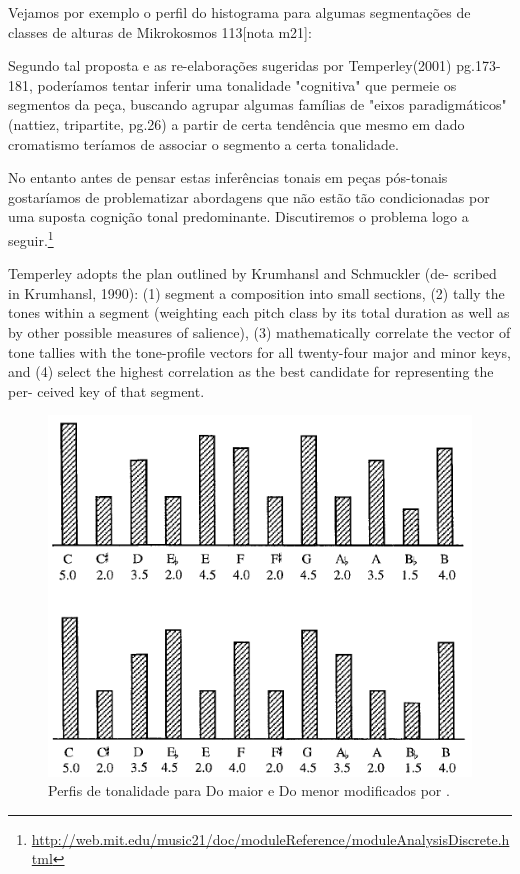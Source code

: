\documentclass[
	12pt,				%
	openright,			%
	twoside,			%
	a4paper,			%
	english,			%
	french,				%
	spanish,			%
	brazil				%
	]{abntex2}
\begin{document}
Vejamos por exemplo o perfil do histograma para algumas segmentações de classes de alturas de Mikrokosmos 113[nota m21]:




Segundo tal proposta e as re-elaborações sugeridas por Temperley(2001) pg.173-181, poderíamos tentar inferir uma tonalidade "cognitiva" que permeie os segmentos da peça, buscando agrupar algumas famílias de "eixos paradigmáticos"(nattiez, tripartite, pg.26) a partir de certa tendência que mesmo em dado cromatismo teríamos de associar o segmento a certa tonalidade.

No entanto antes de pensar estas inferências tonais em peças pós-tonais gostaríamos de problematizar abordagens que não estão tão condicionadas por uma suposta cognição tonal predominante. Discutiremos o problema logo a seguir.\footnote{\url{http://web.mit.edu/music21/doc/moduleReference/moduleAnalysisDiscrete.html}} 

Temperley adopts the plan outlined by Krumhansl and Schmuckler (de- 
scribed in Krumhansl, 1990): (1) segment a composition into small sections, (2) tally 
the tones within a segment (weighting each pitch class by its total duration as well 
as by other possible measures of salience), (3) mathematically correlate the vector 
of tone tallies with the tone-profile vectors for all twenty-four major and minor keys, 
and (4) select the highest correlation as the best candidate for representing the per- 
ceived key of that segment. 




\begin{figure}[!h]
	\caption{\label{fig_grafico}Perfis de tonalidade para Do maior e Do menor modificados por . }
	\begin{center}
	    \includegraphics[scale=0.6]{CBMS/temperley_mod_keyprofile.png}
	\end{center}
\end{figure}
\end{document}
